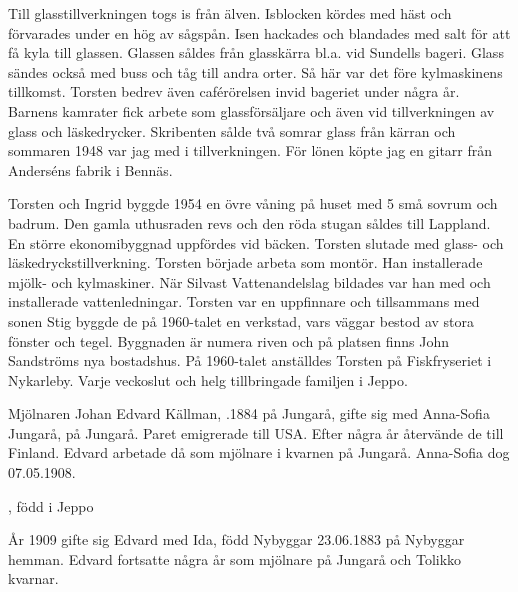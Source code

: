 Till glasstillverkningen togs is från älven. Isblocken kördes med häst och förvarades under en hög av sågspån. Isen hackades och blandades 	med salt för att få kyla till glassen. Glassen såldes från glasskärra bl.a. vid Sundells bageri. Glass sändes också med buss och tåg till andra orter. Så här var det före kylmaskinens tillkomst. Torsten bedrev även caférörelsen invid bageriet under några år. Barnens kamrater fick arbete som glassförsäljare och även vid tillverkningen av glass och läskedrycker. Skribenten sålde två somrar glass från kärran och sommaren 1948 var jag med i tillverkningen. För lönen köpte jag en gitarr från Anderséns fabrik i Bennäs.


Torsten och Ingrid byggde 1954 en övre våning på huset med 5 små sovrum och badrum. Den gamla uthusraden revs och den röda stugan såldes till Lappland. En större ekonomibyggnad uppfördes vid bäcken. Torsten slutade med glass- och läskedryckstillverkning. Torsten började arbeta som montör. Han installerade mjölk- och kylmaskiner. När Silvast	Vattenandelslag bildades var han med och installerade vattenledningar. Torsten var en uppfinnare och tillsammans med sonen Stig byggde de på 1960-talet en verkstad, vars väggar bestod av stora fönster och tegel. 	Byggnaden är numera riven och på platsen finns John Sandströms nya 	bostadshus. På 1960-talet anställdes Torsten på Fiskfryseriet i Nykarleby. Varje veckoslut och helg tillbringade familjen i Jeppo.


Mjölnaren Johan Edvard Källman, .1884 på Jungarå, gifte sig med Anna-Sofia Jungarå,  på Jungarå. Paret emigrerade till USA. Efter några år återvände de till Finland. Edvard arbetade då som mjölnare i kvarnen på Jungarå. Anna-Sofia dog 07.05.1908.
\begin{jhchildren}
  \item {}
  \item {}
  \item {}, född i Jeppo
\end{jhchildren}

År 1909 gifte sig Edvard med Ida, född Nybyggar 23.06.1883 på Nybyggar hemman. Edvard fortsatte några år som mjölnare på Jungarå och Tolikko kvarnar.
\begin{jhchildren}
  \item {}
  \item {}
\end{jhchildren}

